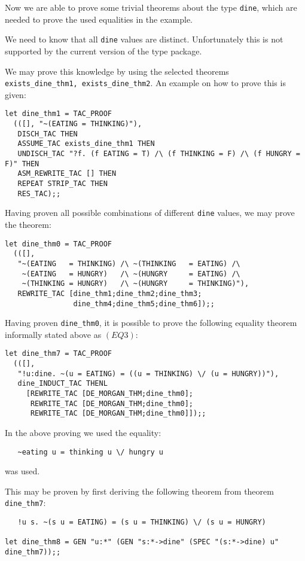 Now we are able to prove some trivial theorems about the type {\tt dine}, 
which are needed to prove the used equalities in the example.

We need to know that all {\tt dine} values are distinct.  Unfortunately this is
not supported by the current version of the type package.

We may prove this knowledge by using the selected theorems {\tt
exists\_dine\_thm1, exists\_dine\_thm2}.  An example on how to prove this is
given:
{\footnotesize 
\begin{verbatim}
let dine_thm1 = TAC_PROOF
  (([], "~(EATING = THINKING)"),
   DISCH_TAC THEN
   ASSUME_TAC exists_dine_thm1 THEN
   UNDISCH_TAC "?f. (f EATING = T) /\ (f THINKING = F) /\ (f HUNGRY = F)" THEN
   ASM_REWRITE_TAC [] THEN
   REPEAT STRIP_TAC THEN
   RES_TAC);;
\end{verbatim}
}

Having proven all possible combinations of different {\tt dine} values, we may 
prove the theorem:
{\footnotesize
\begin{verbatim}
let dine_thm0 = TAC_PROOF
  (([],
   "~(EATING   = THINKING) /\ ~(THINKING   = EATING) /\ 
    ~(EATING   = HUNGRY)   /\ ~(HUNGRY     = EATING) /\
    ~(THINKING = HUNGRY)   /\ ~(HUNGRY     = THINKING)"),
   REWRITE_TAC [dine_thm1;dine_thm2;dine_thm3;
                dine_thm4;dine_thm5;dine_thm6]);;
\end{verbatim}
}

Having proven {\tt dine\_thm0}, it is possible to prove the following
equality theorem informally stated above as $(EQ3)$:

{\footnotesize 
\begin{verbatim}
let dine_thm7 = TAC_PROOF
  (([],
   "!u:dine. ~(u = EATING) = ((u = THINKING) \/ (u = HUNGRY))"),
   dine_INDUCT_TAC THENL
     [REWRITE_TAC [DE_MORGAN_THM;dine_thm0];
      REWRITE_TAC [DE_MORGAN_THM;dine_thm0];
      REWRITE_TAC [DE_MORGAN_THM;dine_thm0]]);;
\end{verbatim}
}

In the above proving we used the equality:
{\footnotesize 
\begin{verbatim}
   ~eating u = thinking u \/ hungry u
\end{verbatim}
}
was used.

This may be proven by first deriving the following theorem from theorem
{\tt dine\_thm7}:

{\footnotesize 
\begin{verbatim}
   !u s. ~(s u = EATING) = (s u = THINKING) \/ (s u = HUNGRY)

let dine_thm8 = GEN "u:*" (GEN "s:*->dine" (SPEC "(s:*->dine) u" dine_thm7));;
\end{verbatim}
}

